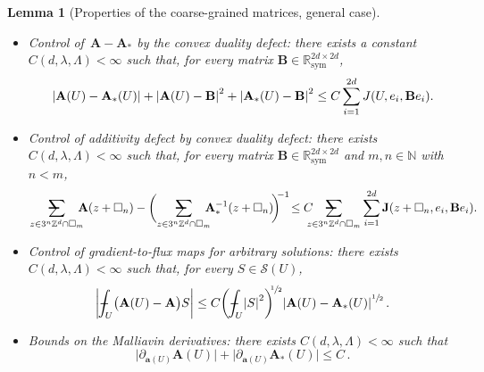\documentclass[11pt]{article} %
\makeatletter
\let\oldsquare\square %
\renewcommand{\square}{\oldsquare}
\numberwithin{equation}{section}
\newtheorem{lemma}[theorem]{Lemma}
\theoremstyle{definition}
\let\originalleft\left
\let\originalright\right
\renewcommand{\left}{\mathopen{}\mathclose\bgroup\originalleft}
\renewcommand{\right}{\aftergroup\egroup\originalright}
\newcommand*{\N}{\ensuremath{\mathbb{N}}}
\newcommand*{\R}{\ensuremath{\mathbb{R}}}
\newcommand*{\Zd}{\ensuremath{\mathbb{Z}^d}}
\renewcommand{\a}{\mathbf{a}}
\newcommand{\cu}{\square}
\renewcommand{\S}{\mathcal{S}}
\newcommand{\avsum}{\mathop{\mathpalette\avsuminner\relax}\displaylimits}
\newcommand\avsuminner[2]{%
  {\sbox0{$\m@th#1\sum$}%
   \vphantom{\usebox0}%
   \ooalign{%
     \hidewidth
     \smash{\,\rule[.23em]{8.8pt}{1.1pt} \relax}%
     \hidewidth\cr
     $\m@th#1\sum$\cr
   }%
  }%
}
\def\Xint#1{\mathchoice
{\XXint\displaystyle\textstyle{#1}}%
{\XXint\textstyle\scriptstyle{#1}}%
{\XXint\scriptstyle\scriptscriptstyle{#1}}%
{\XXint\scriptscriptstyle\scriptscriptstyle{#1}}%
\!\int}
\def\XXint#1#2#3{{\setbox0=\hbox{$#1{#2#3}{\int}$}
\vcenter{\hbox{$#2#3$}}\kern-.5\wd0}}
\def\fint{\Xint-}
\newcommand{\bfA}{\mathbf{A}}
\newcommand{\bfJ}{\mathbf{J}}
\makeatother
\begin{document}
\begin{lemma}[Properties of the coarse-grained matrices, general case]
\begin{itemize}
\item Control of~$\bfA-\bfA_*$ by the convex duality defect: there exists a constant~$C(d,\lambda,\Lambda)<\infty$ such that, for every matrix $\mathbf{B}\in \R^{2d\times 2d}_{\mathrm{sym}}$,
\begin{equation} 
\label{e.diagonalset.nonsymm}
\left| \bfA(U) - \bfA_*(U) \right| 
+
\left| \bfA(U) - \mathbf{B} \right|^2 
+
\left| \bfA_*(U) - \mathbf{B} \right|^2 
\leq C \sum_{i=1}^{2d} J(U,e_i,\mathbf{B} e_i). 
\end{equation}

\item Control of additivity defect by convex duality defect: there exists~$C(d,\lambda,\Lambda)<\infty$ such that, for every matrix $\mathbf{B} \in \R^{2d\times 2d}_{\mathrm{sym}}$ and $m,n\in\N$ with $n<m$, 
\begin{align}
\label{e.additivity.by.J.nonsymm}
\avsum_{z\in 3^n\Zd\cap \cu_m} \!\!\!\!
\bfA(z+\cu_n) 
- 
\biggl( \avsum_{z\in 3^n\Zd\cap \cu_m} \!\!\!\!
\bfA_*^{-1} (z+\cu_n) \! \biggr)^{\!\! -1}
\! \leq
C \!\!\!\! \avsum_{z\in 3^n\Zd\cap \cu_m}
\sum_{i=1}^{2d} 
\bfJ (z+\cu_n,e_i,\mathbf{B} e_i). 
\end{align}

\item Control of gradient-to-flux maps for arbitrary solutions: there exists $C(d,\lambda,\Lambda)<\infty$ such that, for every $S\in \S(U)$,
\begin{align}
\label{e.fluxmaps.nonsymm}
\left| 
\fint_U \bigl( \bfA(U) - \bfA \bigr) S
\right| 
\leq 
C \left( \fint_U \left| S \right|^2 \right)^{\!\!\sfrac12} 
\left| \bfA(U) - \bfA_*(U) \right|^{\sfrac12} 
\,.
\end{align}

\item Bounds on the Malliavin derivatives: there exists $C(d,\lambda,\Lambda)<\infty$ such that
\begin{equation}
\label{e.maul.Mall}
\bigl| \partial_{\a(U)} \bfA(U) \bigr| + \bigl| \partial_{\a(U)} \bfA_*(U) \bigr| \leq C\,.
\end{equation}
\end{itemize}
\end{lemma}
\end{document}
